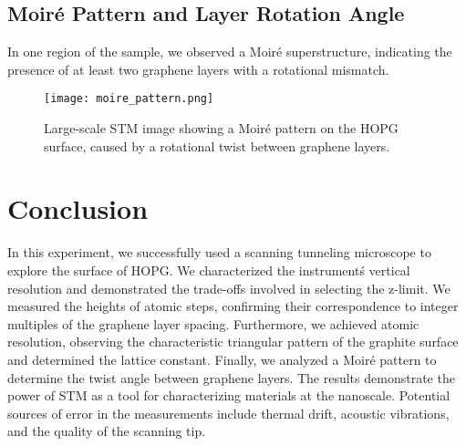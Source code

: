 \documentclass[12pt,a4paper]{article}
\begin{document}
\subsection{Moiré Pattern and Layer Rotation Angle}
In one region of the sample, we observed a Moiré superstructure, indicating the presence of at least two graphene layers with a rotational mismatch.

\begin{figure}[H]
    \centering
    \texttt{[image: moire\_pattern.png]}
    \caption{Large-scale STM image showing a Moiré pattern on the HOPG surface, caused by a rotational twist between graphene layers.}
    \label{fig:moire}
\end{figure}


\section{Conclusion}
In this experiment, we successfully used a scanning tunneling microscope to explore the surface of HOPG. We characterized the instrument\'s vertical resolution and demonstrated the trade-offs involved in selecting the z-limit. We measured the heights of atomic steps, confirming their correspondence to integer multiples of the graphene layer spacing. Furthermore, we achieved atomic resolution, observing the characteristic triangular pattern of the graphite surface and determined the lattice constant. %
Finally, we analyzed a Moiré pattern to determine the twist angle between graphene layers. %
The results demonstrate the power of STM as a tool for characterizing materials at the nanoscale. Potential sources of error in the measurements include thermal drift, acoustic vibrations, and the quality of the scanning tip.

\printbibliography
\end{document}
